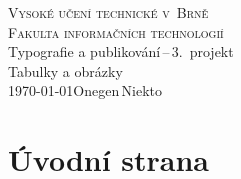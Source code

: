 \documentclass[a4paper, 11pt]{article}
\begin{document}
\begin{titlepage}
	\begin{center}
		{\Huge \textsc{Vysoké učení technické v~Brně}\\}
		{\huge \textsc{Fakulta informačních technologií}\\}
		{\LARGE Typografie a publikování\,--\,3.\ projekt\\}
		{\Huge Tabulky a obrázky\\}
		{\Large \today \hfill Onegen\,Niekto}
	\end{center}
\end{titlepage}

\section{Úvodní strana}
\end{document}
